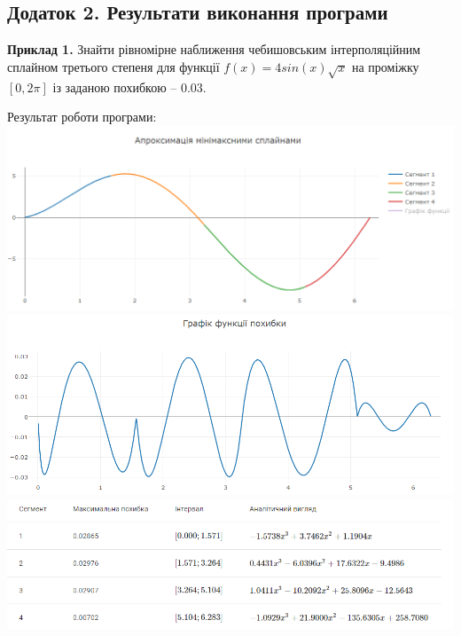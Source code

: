 \documentclass[ukrainian,14pt]{extarticle}
\begin{document}
% 

\setcounter{page}{41}
\subsection*{Додаток 2. Результати виконання програми}

\textbf{Приклад 1.} Знайти рівномірне наближення чебишовським інтерполяційним сплайном третього степеня для функції $f(x) = 4sin(x) \sqrt{x}$ на проміжку $[0, 2\pi]$ із заданою похибкою – $0.03$.


Результат роботи програми:
\vspace{0.5cm} \\

\includegraphics[scale=0.65]{examples/1_approx.png}
\vspace{0.5cm}
\includegraphics[scale=0.65]{examples/1_error.png}
\vspace{0.5cm}
\includegraphics[scale=0.7]{examples/1_table.png}
\end{document}
